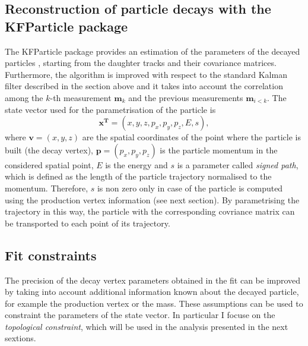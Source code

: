 \documentclass[b5paper,10pt,twoside,oldstyle,classica]{toptesi}
\begin{document}
\subsection{Reconstruction of particle decays with the KFParticle package}
\label{KFParticle_sec}
The KFParticle package provides an estimation of the parameters of the decayed particles \cite{Kisel:2006}, starting from the daughter tracks and their covariance matrices. Furthermore, the algorithm is improved with respect to the standard Kalman filter described in the section above and it takes into account the correlation among the $k$-th measurement $\pmb{m}_k$ and the previous measurements $\pmb{m}_{i<k}$. The state vector used for the parametrisation of the particle is 
\begin{equation}
 \pmb{x^T} = (x,y,z,p_x,p_y,p_z,E,s),
 \label{statevectorKF}
\end{equation}
where $\pmb{v} = (x,y,z)$ are the spatial coordinates of the point where the particle is built (the decay vertex), $\pmb{p} = (p_x,p_y,p_z)$ is the particle momentum in the considered spatial point, $E$ is the energy and $s$ is a parameter called \textit{signed path}, which is defined as the length of the particle trajectory normalised to the momentum. Therefore, $s$ is non zero only in case of the particle is computed using the production vertex information (see next section). By parametrising the trajectory in this way, the particle with the corresponding covriance matrix can be transported to each point of its trajectory. 
\subsection{Fit constraints}
The precision of the decay vertex parameters obtained in the fit can be improved by taking into account additional information known about the decayed particle, for example the production vertex or the mass. These assumptions can be used to constraint the parameters of the state vector. In particular I focuse on the \textit{topological constraint}, which will be used in the analysis presented in the next sextions.
\end{document}
